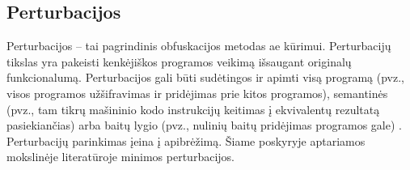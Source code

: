 \subsection{Perturbacijos}\label{sec:literature:perturbations}

Perturbacijos -- tai pagrindinis obfuskacijos metodas \ac{ae} kūrimui.
Perturbacijų tikslas yra pakeisti kenkėjiškos programos veikimą išsaugant
originalų funkcionalumą. Perturbacijos gali būti sudėtingos ir apimti visą
programą (pvz., visos programos užšifravimas ir pridėjimas prie kitos
programos), semantinės (pvz., tam tikrų mašininio kodo instrukcijų keitimas į
ekvivalentų rezultatą pasiekiančias) arba baitų lygio (pvz., nulinių baitų
pridėjimas programos gale) \cite{huGeneratingAdversarialMalware2017}. Perturbacijų parinkimas įeina į
 apibrėžimą. Šiame poskyryje aptariamos mokslinėje
literatūroje minimos perturbacijos.
